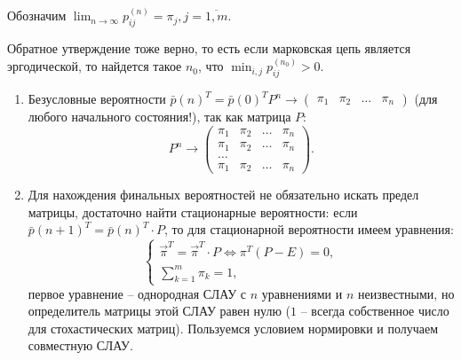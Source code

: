 Обозначим $\lim_{n\to\infty} p_{ij}^{(n)} = \pi_j, j = \overline{1, m}$. 

\begin{remark}
  Обратное утверждение тоже верно, то есть если марковская цепь является эргодической, то найдется
  такое $n_0$, что $\min_{i, j} p_{ij}^{(n_0)} > 0$.
\end{remark}

\begin{corollary}
  \begin{enumerate}
    \item Безусловные вероятности $\bar{p} (n)^T = \bar{p}(0)^T P^n \to
      \begin{pmatrix} \pi_1 & \pi_2 & \dots & \pi_n \end{pmatrix}$ (для любого начального
      состояния!), так как матрица $P$:
      \[
        P^n \to \begin{pmatrix}
          \pi_1 & \pi_2 & \dots & \pi_n \\
          \pi_1 & \pi_2 & \dots & \pi_n \\
          \dots \\
          \pi_1 & \pi_2 & \dots & \pi_n
        \end{pmatrix}.
      \]

    \item Для нахождения финальных вероятностей не обязательно искать предел матрицы,
      достаточно найти стационарные вероятности: если $\bar{p}(n+1)^T = \bar{p}(n)^T \cdot P$,
      то для стационарной вероятности имеем уравнения:
      \[
        \begin{cases}
          \vec{\pi}^T = \vec{\pi}^T \cdot P \Leftrightarrow \pi^T (P - E) = 0,\\
          \sum_{k=1}^m \pi_k = 1,
        \end{cases}
      \]
      первое уравнение -- однородная СЛАУ с $n$ уравнениями и $n$ неизвестными, но определитель
      матрицы этой СЛАУ равен нулю ($1$ -- всегда собственное число для стохастических матриц). 
      Пользуемся условием нормировки и получаем совместную СЛАУ.

  \end{enumerate}
\end{corollary}
